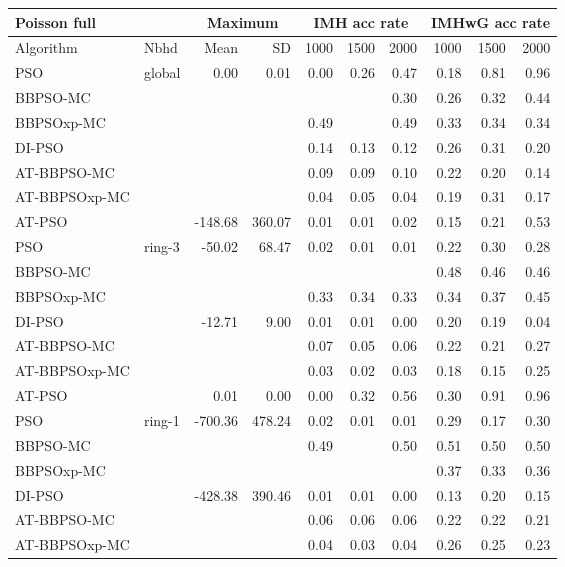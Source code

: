 \documentclass[12pt]{article}
\begin{document}
\begin{table}[h]
\centering
\tiny{
\begin{tabular}{llrr|rrr|rrr}
\multicolumn{2}{l}{Poisson full}& \multicolumn{2}{c}{Maximum} & \multicolumn{3}{c}{IMH acc rate}  &\multicolumn{3}{c}{IMHwG acc rate}\\
  \hline 
Algorithm & Nbhd & Mean & SD & 1000 & 1500 & 2000 & 1000 & 1500 & 2000 \\ 
  \hline
PSO & global & 0.00 & 0.01 & 0.00 & 0.26 & 0.47 & 0.18 & 0.81 & 0.96 \\ 
  BBPSO-MC &  &  &  &  &  & 0.30 & 0.26 & 0.32 & 0.44 \\ 
  BBPSOxp-MC &  &  &  & 0.49 &  & 0.49 & 0.33 & 0.34 & 0.34 \\ 
  DI-PSO &  &  &  & 0.14 & 0.13 & 0.12 & 0.26 & 0.31 & 0.20 \\ 
  AT-BBPSO-MC &  &  &  & 0.09 & 0.09 & 0.10 & 0.22 & 0.20 & 0.14 \\ 
  AT-BBPSOxp-MC &  &  &  & 0.04 & 0.05 & 0.04 & 0.19 & 0.31 & 0.17 \\ 
  AT-PSO &  & -148.68 & 360.07 & 0.01 & 0.01 & 0.02 & 0.15 & 0.21 & 0.53 \\ \hline
  PSO & ring-3 & -50.02 & 68.47 & 0.02 & 0.01 & 0.01 & 0.22 & 0.30 & 0.28 \\ 
  BBPSO-MC &  &  &  &  &  &  & 0.48 & 0.46 & 0.46 \\ 
  BBPSOxp-MC &  &  &  & 0.33 & 0.34 & 0.33 & 0.34 & 0.37 & 0.45 \\ 
  DI-PSO &  & -12.71 & 9.00 & 0.01 & 0.01 & 0.00 & 0.20 & 0.19 & 0.04 \\ 
  AT-BBPSO-MC &  &  &  & 0.07 & 0.05 & 0.06 & 0.22 & 0.21 & 0.27 \\ 
  AT-BBPSOxp-MC &  &  &  & 0.03 & 0.02 & 0.03 & 0.18 & 0.15 & 0.25 \\ 
  AT-PSO &  & 0.01 & 0.00 & 0.00 & 0.32 & 0.56 & 0.30 & 0.91 & 0.96 \\ \hline
  PSO & ring-1 & -700.36 & 478.24 & 0.02 & 0.01 & 0.01 & 0.29 & 0.17 & 0.30 \\ 
  BBPSO-MC &  &  &  & 0.49 &  & 0.50 & 0.51 & 0.50 & 0.50 \\ 
  BBPSOxp-MC &  &  &  &  &  &  & 0.37 & 0.33 & 0.36 \\ 
  DI-PSO &  & -428.38 & 390.46 & 0.01 & 0.01 & 0.00 & 0.13 & 0.20 & 0.15 \\ 
  AT-BBPSO-MC &  &  &  & 0.06 & 0.06 & 0.06 & 0.22 & 0.22 & 0.21 \\ 
  AT-BBPSOxp-MC &  &  &  & 0.04 & 0.03 & 0.04 & 0.26 & 0.25 & 0.23 \\ 

\end{tabular}}
\end{table}
\end{document}
